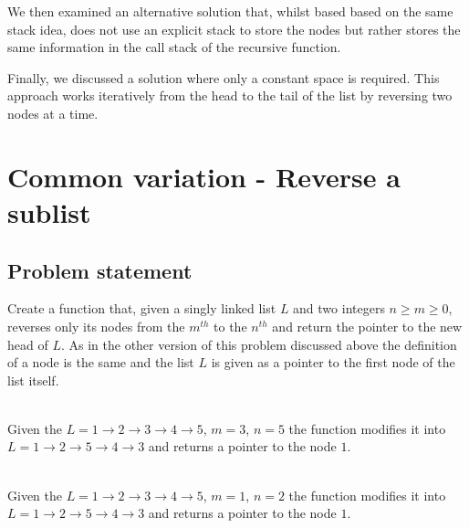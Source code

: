We then examined an alternative solution that, whilst based based on the same stack idea, does not use an explicit stack to store the nodes but rather stores the same information in the 
call stack of the recursive function. 

Finally,  we discussed a solution where only a constant space is required. This approach works iteratively from the head to the tail of the list by reversing two nodes at a time.

\section{Common variation - Reverse a sublist}
\subsection{Problem statement}
\begin{exercise}
Create a function that,  given a singly linked list $L$ and two integers $n \geq  m \geq 0$,
reverses only its nodes from the $m^{th}$ to the $n^{th}$ and return the pointer to the new
head of $L$. As in the other version of this problem discussed above the definition of a node is the same and the list 
$L$ is given as a pointer to the first node of the list itself.

\begin{example}
	\hfill \\
	Given the $L = 1 \rightarrow 2 \rightarrow 3 \rightarrow 4 \rightarrow 5$, $m = 3$, $n = 5$ the function modifies
	it into $L = 1 \rightarrow 2 \rightarrow 5 \rightarrow 4 \rightarrow 3$ and returns a pointer to
	the node $1$.
\end{example}

\begin{example}
	\hfill \\
	Given the $L = 1 \rightarrow 2 \rightarrow 3 \rightarrow 4 \rightarrow 5$, $m = 1$, $n = 2$ the function modifies
	it into $L = 1 \rightarrow 2 \rightarrow 5 \rightarrow 4 \rightarrow 3$ and returns a pointer to
	the node $1$.
\end{example}

\end{exercise}
